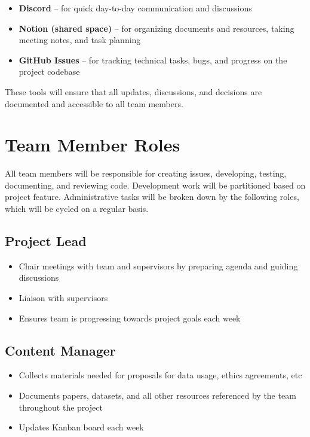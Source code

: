 \documentclass{article}
\begin{document}
\begin{itemize}
    \item \textbf{Discord} – for quick day-to-day communication and discussions
    \item \textbf{Notion (shared space)} – for organizing documents and resources, taking meeting notes, and task planning
    \item \textbf{GitHub Issues} – for tracking technical tasks, bugs, and progress on the project codebase
\end{itemize}

These tools will ensure that all updates, discussions, and decisions are documented and accessible to all team members.

\section{Team Member Roles}


All team members will be responsible for creating issues, developing, testing, documenting, and reviewing code. Development work will be partitioned based on project feature. Administrative tasks will be broken down by the following roles, which will be cycled on a regular basis.

\subsection{Project Lead}

\begin{itemize}
  \item Chair meetings with team and supervisors by preparing agenda and guiding discussions
  \item Liaison with supervisors
  \item Ensures team is progressing towards project goals each week
\end{itemize}

\subsection{Content Manager}

\begin{itemize}
  \item Collects materials needed for proposals for data usage, ethics agreements, etc
  \item Documents papers, datasets, and all other resources referenced by the team throughout the project
  \item Updates Kanban board each week
\end{itemize}
\end{document}
